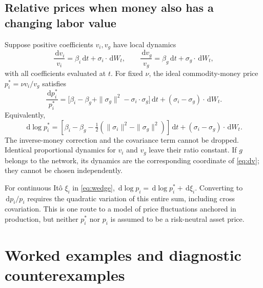 \documentclass[11pt,letterpaper]{article}
\newcommand{\dd}{\,\mathrm d}
\begin{document}
\subsection{Relative prices when money also has a changing labor value}
Suppose positive coefficients $v_i,v_g$ have local dynamics
\begin{equation}\label{eq:relativevalue}
 \frac{\dd v_i}{v_i}=\beta_i\dd t+\sigma_i\cdot\dd W_t,
 \qquad
 \frac{\dd v_g}{v_g}=\beta_g\dd t+\sigma_g\cdot\dd W_t,
\end{equation}
with all coefficients evaluated at $t$. For fixed $\nu$, the ideal
commodity-money price $p_i^*=\nu v_i/v_g$ satisfies
\begin{equation}\label{eq:priceSDE}
 \frac{\dd p_i^*}{p_i^*}
 =\bigl[\beta_i-\beta_g+\|\sigma_g\|^2
                    -\sigma_i\cdot\sigma_g\bigr]\dd t
       +(\sigma_i-\sigma_g)\cdot\dd W_t.
\end{equation}
Equivalently,
\begin{equation}\label{eq:logprice}
 \dd\log p_i^*
 =\left[\beta_i-\beta_g-\tfrac12
                  (\|\sigma_i\|^2-\|\sigma_g\|^2)\right]\dd t
       +(\sigma_i-\sigma_g)\cdot\dd W_t.
\end{equation}
The inverse-money correction and the covariance term cannot be dropped.
Identical proportional dynamics for $v_i$ and $v_g$ leave their ratio
constant. If $g$ belongs to the network, its dynamics are the corresponding
coordinate of \eqref{eq:dv}; they cannot be chosen independently.

For continuous It\^o $\xi_i$ in \eqref{eq:wedge},
$\dd\log p_i=\dd\log p_i^*+\dd\xi_i$. Converting to $\dd p_i/p_i$
requires the quadratic variation of this entire sum, including cross
covariation. This is one route to a model of price fluctuations anchored
in production, but neither $p_i^*$ nor $p_i$ is assumed to be a
risk-neutral asset price.

\section{Worked examples and diagnostic counterexamples}
\end{document}
